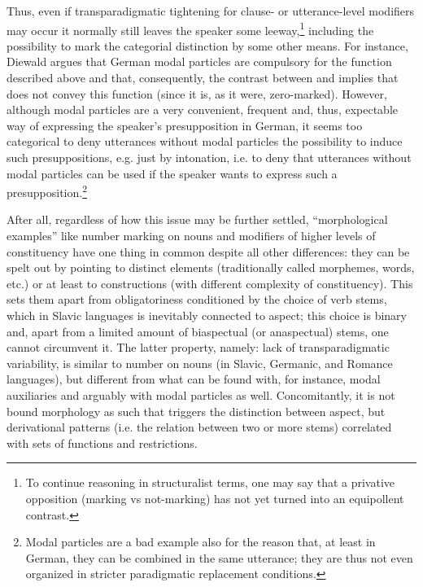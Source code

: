 \documentclass[output=paper]{langscibook}
\begin{document}
Thus, even if transparadigmatic tightening for clause- or utterance-level modifiers may occur it normally still leaves the speaker some leeway,\footnote{To continue reasoning in structuralist terms, one may say that a privative opposition (marking vs not-marking) has not yet turned into an equipollent contrast.} including the possibility to mark the categorial distinction by some other means. For instance, Diewald argues that German modal particles are compulsory for the function described above and that, consequently, the contrast between  and  implies that  does not convey this function (since it is, as it were, zero-marked). However, although modal particles are a very convenient, frequent and, thus, expectable way of expressing the speaker’s presupposition in German, it seems too categorical to deny utterances without modal particles the possibility to induce such presuppositions, e.g. just by intonation, i.e. to deny that utterances without modal particles can be used if the speaker wants to express such a presupposition.\footnote{Modal particles are a bad example also for the reason that, at least in German, they can be combined in the same utterance; they are thus not even organized in stricter paradigmatic replacement conditions.}

After all, regardless of how this issue may be further settled, “morphological examples” like number marking on nouns and modifiers of higher levels of constituency have one thing in common despite all other differences: they can be spelt out by pointing to distinct elements (traditionally called morphemes, words, etc.) or at least to constructions (with different complexity of constituency). This sets them apart from obligatoriness conditioned by the choice of verb stems, which in Slavic languages is inevitably connected to aspect; this choice is binary and, apart from a limited amount of biaspectual (or anaspectual) stems, one cannot circumvent it. The latter property, namely: lack of transparadigmatic variability, is similar to number on nouns (in Slavic, Germanic, and Romance languages), but different from what can be found with, for instance, modal auxiliaries and arguably with modal particles as well. Concomitantly, it is not bound morphology as such that triggers the distinction between aspect, but derivational patterns (i.e. the relation between two or more stems) correlated with sets of functions and restrictions.
\end{document}
